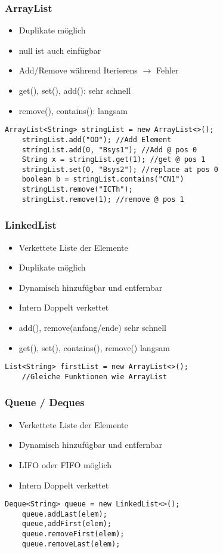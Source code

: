 \begin{multicols*}{5}
		\subsubsection{ArrayList}
			\begin{itemize}
				\item Duplikate möglich
				\item null ist auch einfügbar
				\item Add/Remove während Iterierens $\rightarrow$ Fehler
				\item get(), set(), add(): sehr schnell
				\item remove(), contains(): langsam
			\end{itemize}
			\begin{lstlisting}
ArrayList<String> stringList = new ArrayList<>();
	stringList.add("OO"); //Add Element
	stringList.add(0, "Bsys1"); //Add @ pos 0
	String x = stringList.get(1); //get @ pos 1
	stringList.set(0, "Bsys2"); //replace at pos 0
	boolean b = stringList.contains("CN1")
	stringList.remove("ICTh");
	stringList.remove(1); //remove @ pos 1
			\end{lstlisting}

		\subsubsection{LinkedList}
		\begin{itemize}
			\item Verkettete Liste der Elemente
			\item Duplikate möglich
			\item Dynamisch hinzufügbar und entfernbar
			\item Intern Doppelt verkettet
			\item add(), remove(anfang/ende) sehr schnell
			\item get(), set(), contains(), remove() langsam
		\end{itemize}
		\begin{lstlisting}
List<String> firstList = new ArrayList<>();
	//Gleiche Funktionen wie ArrayList
		\end{lstlisting}

		\subsubsection{Queue / Deques}
		\begin{itemize}
			\item Verkettete Liste der Elemente
			\item Dynamisch hinzufügbar und entfernbar
			\item LIFO oder FIFO möglich
			\item Intern Doppelt verkettet
		\end{itemize}
		\begin{lstlisting}
Deque<String> queue = new LinkedList<>();
	queue.addLast(elem);
	queue,addFirst(elem);
	queue.removeFirst(elem);
	queue.removeLast(elem);
		\end{lstlisting}


\end{multicols*}
